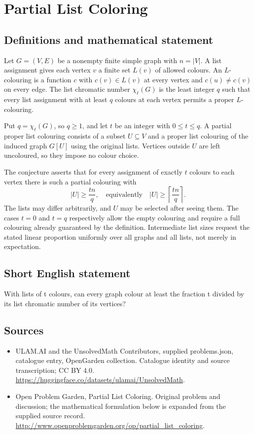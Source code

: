 \documentclass[11pt,a4paper]{article}
\begin{document}
\section*{Partial List Coloring}\label{statement}

\subsection{Definitions and mathematical statement}
Let $G=(V,E)$ be a nonempty
finite simple graph with
$n=|V|$. A list assignment
gives each vertex $v$ a
finite set $L(v)$ of allowed
colours. An $L$-colouring
is a function $c$ with
$c(v)\in L(v)$ at every
vertex and $c(u)\neq c(v)$
on every edge. The list
chromatic number $\chi_\ell(G)$
is the least integer $q$
such that every list assignment
with at least $q$ colours
at each vertex permits a
proper $L$-colouring.

Put $q=\chi_\ell(G)$, so
$q\geq1$, and let $t$
be an integer with
$0\leq t\leq q$. A partial
proper list colouring consists
of a subset $U\subseteq V$
and a proper list colouring
of the induced graph $G[U]$
using the original lists.
Vertices outside $U$ are
left uncoloured, so they
impose no colour choice.

The conjecture asserts that
for every assignment of
exactly $t$ colours to each
vertex there is such a
partial colouring with
\[
 |U|\geq\frac{tn}{q},
 \quad\text{equivalently}\quad
 |U|\geq\left\lceil\frac{tn}{q}\right\rceil.
\]
The lists may differ arbitrarily,
and $U$ may be selected
after seeing them. The cases
$t=0$ and $t=q$ respectively
allow the empty colouring
and require a full colouring
already guaranteed by the
definition. Intermediate list
sizes request the stated
linear proportion uniformly
over all graphs and all
lists, not merely in
expectation.
\subsection{Short English statement}
With lists of t colours, can every graph colour at least the fraction t divided by its list chromatic number of its vertices?
\subsection{Sources}
\begin{itemize}
\item[S1] ULAM.AI and the UnsolvedMath Contributors, supplied problems.json, catalogue entry, OpenGarden collection. Catalogue identity and source transcription; CC BY 4.0.
\url{https://huggingface.co/datasets/ulamai/UnsolvedMath}.
\item[S2] Open Problem Garden, Partial List Coloring. Original problem and discussion; the mathematical formulation below is expanded from the supplied source record.
\url{http://www.openproblemgarden.org/op/partial_list_coloring}.
\end{itemize}
\end{document}

